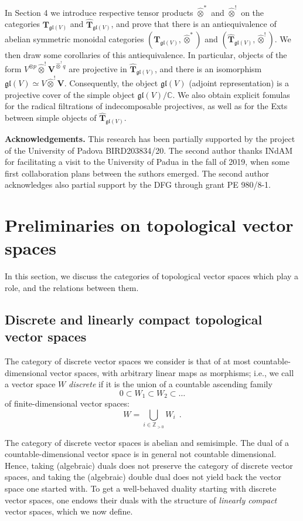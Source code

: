 \documentclass[12pt,reqno]{amsart}
\newcommand{\CC}{\mathbb{C}}
\newcommand{\ZZ}{\mathbb{Z}}
\theoremstyle{definition}
\theoremstyle{remark}
\begin{document}
	
	In Section 4 we introduce respective tensor products $\widehat{\otimes}^\ast$ and $\widehat{\otimes}^!$ on the categories $\mathbf{T}_{\mathfrak{gl}(V)}$ and $\widehat{\mathbf{T}}_{\mathfrak{gl}(V)}$, and prove that there is an antiequivalence of abelian symmetric monoidal categories $(\mathbf{T}_{\mathfrak{gl}(V)}, \widehat{\otimes}^\ast)$ and $(\widehat{\mathbf{T}}_{\mathfrak{gl}(V)}, \widehat{\otimes}^!)$. We then
	draw some corollaries of this antiequivalence. In particular, objects of the form $ V^{\otimes p}\widehat{\otimes}^!\mathbf{V}^{\widehat{\otimes}^! q}$ are projective in $\widehat{\mathbf{T}}_{\mathfrak{gl}(V)}$, and there is an isomorphism $\mathfrak{gl}(V) \simeq V\widehat{\otimes}^!\mathbf{V}$. Consequently, the object $ \mathfrak{gl}(V) $ (adjoint representation) is a projective cover of the simple object  $ \mathfrak{gl}(V)/\CC $. We also obtain explicit fomulas for the radical filtrations of indecomposable projectives, as well as for the Exts between simple objects of $\widehat{\mathbf{T}}_{\mathfrak{gl}(V)}$.
	
	\textbf{Acknowledgements.}
	This research has been partially supported by the project of the University of Padova BIRD203834/20.
	The second author thanks INdAM for facilitating a visit to the University of Padua in the fall of 2019, when some first collaboration plans between the suthors emerged.
	The second author acknowledges also partial support by the DFG through grant PE 980/8-1.
	
	\section{Preliminaries on topological vector spaces}
	In this section, we discuss the categories of topological vector spaces which play a role, and the relations between them.
	
	\subsection{Discrete and linearly compact topological vector spaces}
	The category of discrete vector spaces we consider is that of at most countable-dimensional vector spaces, with arbitrary linear maps as morphisms; i.e., we call a vector space $W$ \emph{discrete} if it is the union of a countable ascending family
	$$
	0 \subset W_1 \subset W_2 \subset \ldots
	$$
	of finite-dimensional vector spaces:
	$$
	W = \bigcup_{i\in \ZZ_{> 0}} W_i \ \ .
	$$
	
	The category of discrete vector spaces is abelian  and semisimple. The dual of a countable-dimensional vector space is in general not countable dimensional. Hence, taking (algebraic) duals does not preserve the category of discrete vector spaces, and taking the (algebraic) double dual does not yield back the vector space one started with. To get a well-behaved duality starting with discrete vector spaces, one endows their duals with the structure of \emph{linearly compact} vector spaces, which we now define.
	
\end{document}
